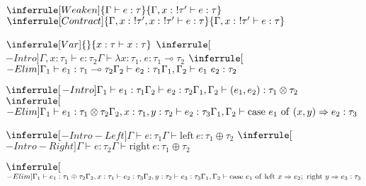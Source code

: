 \vspace*{\fill}
\clearpage
{}
\vspace*{\fill}
\begin{mdframed}
\begin{figure}[H]
		\begin{mathpar}
			$\inferrule[Weaken]{\Gamma \vdash e : \tau}{\Gamma, x :\ !\tau' \vdash e : \tau}$ \hspace{1.5em}
			$\inferrule[Contract]{\Gamma, x :\ !\tau', x :\ !\tau' \vdash e : \tau}{\Gamma, x :\ !\tau' \vdash e : \tau}$ 
		\end{mathpar} 
		\begin{mathpar}
			$\inferrule[Var]{ }{x : \tau \vdash x : \tau}$ \hspace{1.5em}
			$\inferrule[$\multimap$-Intro]{\Gamma, x : \tau_1 \vdash e : \tau_2}{\Gamma \vdash \lambda x : \tau_1.\ e : \tau_1 \multimap \tau_2}$ \hspace{1.5em}
			$\inferrule[$\multimap$-Elim]{\Gamma_1 \vdash e_1 : \tau_1 \multimap \tau_2 \\ \Gamma_2 \vdash e_2 : \tau_1}{\Gamma_1, \Gamma_2 \vdash e_1\ e_2 : \tau_2}$
		\end{mathpar}
		\begin{mathpar}
			$\inferrule[$\otimes$-Intro]{\Gamma_1 \vdash e_1 : \tau_1 \\ \Gamma_2 \vdash e_2 : \tau_2}{\Gamma_1, \Gamma_2 \vdash (e_1, e_2) : \tau_1 \otimes \tau_2}$ \hspace{1.5em}
			$\inferrule[$\otimes$-Elim]{\Gamma_1 \vdash e_1 : \tau_1 \otimes \tau_2 \\ \Gamma_2, x : \tau_1, y : \tau_2 \vdash e_2 : \tau_3}{\Gamma_1, \Gamma_2 \vdash \mathrm{case}\ e_1\ \mathrm{of}\ (x, y) \Rightarrow e_2 : \tau_3}$
		\end{mathpar}
		\begin{mathpar}
			$\inferrule[$\oplus$-Intro-Left]{\Gamma \vdash e : \tau_1}{\Gamma \vdash \mathrm{left}\ e : \tau_1 \oplus \tau_2}$ \hspace{1.5em}
			$\inferrule[$\oplus$-Intro-Right]{\Gamma \vdash e : \tau_2}{\Gamma \vdash \mathrm{right}\ e : \tau_1 \oplus \tau_2}$ 
		\end{mathpar}
		\begin{mathpar}
			$\inferrule[$\oplus$-Elim]{\Gamma_1 \vdash e_1 : \tau_1 \oplus \tau_2 \\ \Gamma_2, x : \tau_1 \vdash e_2 : \tau_3 \\ \Gamma_2, y : \tau_2 \vdash e_3 : \tau_3}{\Gamma_1, \Gamma_2 \vdash \mathrm{case}\ e_1\ \mathrm{of}\ \mathrm{left}\ x \Rightarrow e_2;\ \mathrm{right}\ y \Rightarrow e_3 : \tau_3}$

\end{mathpar}
\end{figure}
\end{mdframed}
